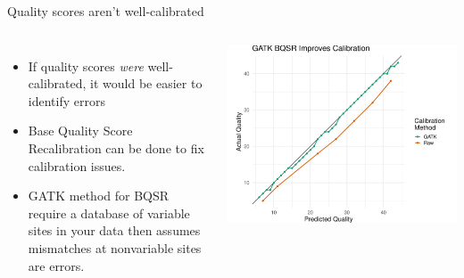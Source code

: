 \documentclass[table]{beamer}
\begin{document}
\begin{frame}{Quality scores aren't well-calibrated}
\begin{columns}
\begin{itemize}
\item If quality scores \textit{were} well-calibrated, it would be easier to identify errors
\item Base Quality Score Recalibration can be done to fix calibration issues.
\item GATK method for BQSR require a database of variable sites in your data
then assumes mismatches at nonvariable sites are errors.
\end{itemize}
\includegraphics[width=.95\linewidth]{gatk_comparison.pdf}
\end{columns}
\end{frame}
\end{document}
